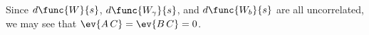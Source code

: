 Since $d\func{W}{s}$, $d\func{W_{\gamma}}{s}$, and $d\func{W_{b}}{s}$ are all uncorrelated, we may see that $\ev{A\,C} = \ev{B\,C} = 0$.